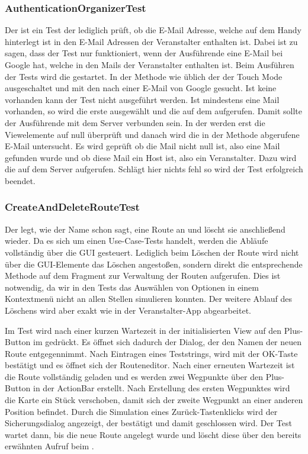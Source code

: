 \subsubsection{AuthenticationOrganizerTest}
Der  ist ein Test der lediglich prüft, ob die E-Mail Adresse, welche auf dem Handy hinterlegt ist in den E-Mail Adressen der Veranstalter enthalten ist. Dabei ist zu sagen, dass der Test nur funktioniert, wenn der Ausführende eine E-Mail bei Google hat, welche in den Mails der Veranstalter enthalten ist. Beim Ausführen der Tests wird die  gestartet. In der  Methode wie üblich der der Touch Mode ausgeschaltet und mit den  nach einer E-Mail von Google gesucht. Ist keine vorhanden kann der Test nicht ausgeführt werden. Ist mindestens eine Mail vorhanden, so wird die erste ausgewählt und die  auf dem  aufgerufen. Damit sollte der Ausführende mit dem Server verbunden sein. In der  werden erst die Viewelemente auf null überprüft und danach wird die in der  Methode abgerufene E-Mail untersucht. Es wird geprüft ob die Mail nicht null ist, also eine Mail gefunden wurde und ob diese Mail ein Host ist, also ein Veranstalter. Dazu wird die  auf dem Server aufgerufen. Schlägt hier nichts fehl so wird der Test erfolgreich beendet.

\subsubsection{CreateAndDeleteRouteTest}
Der  legt, wie der Name schon sagt, eine Route an und löscht sie anschließend wieder. Da es sich um einen Use-Case-Tests handelt, werden die Abläufe vollständig über die GUI gesteuert. Lediglich beim Löschen der Route wird nicht über die GUI-Elemente das Löschen angestoßen, sondern direkt die entsprechende Methode auf dem Fragment zur Verwaltung der Routen aufgerufen. Dies ist notwendig, da wir in den Tests das Auswählen von Optionen in einem Kontextmenü nicht an allen Stellen simulieren konnten. Der weitere Ablauf des Löschens wird aber exakt wie in der Veranstalter-App abgearbeitet.

Im Test wird nach einer kurzen Wartezeit in der initialisierten View auf den Plus-Button im  gedrückt. Es öffnet sich dadurch der Dialog, der den Namen der neuen Route entgegennimmt. Nach Eintragen eines Teststrings, wird mit der OK-Taste bestätigt und es öffnet sich der Routeneditor. Nach einer erneuten Wartezeit ist die Route vollständig geladen und es werden zwei Wegpunkte über den Plus-Button in der ActionBar erstellt. Nach Erstellung des ersten Wegpunktes wird die Karte ein Stück verschoben, damit sich der zweite Wegpunkt an einer anderen Position befindet. Durch die Simulation eines Zurück-Tastenklicks wird der Sicherungsdialog angezeigt, der bestätigt und damit geschlossen wird. Der Test wartet dann, bis die neue Route angelegt wurde und löscht diese über den bereits erwähnten Aufruf beim .

